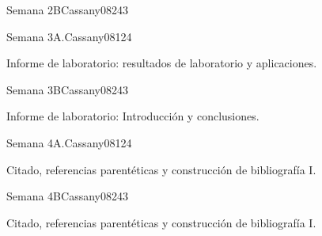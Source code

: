\begin{syllabus}
\begin{unit}{Semana 2B}{Cassany08}{24}{3}
   \begin{learningoutcomes}
      \item 
      \item
      \item 
      \end{learningoutcomes}
\end{unit}

\begin{unit}{Semana 3A.}{Cassany08}{12}{4}
   \begin{topics}
      \item Informe de laboratorio: resultados de laboratorio y aplicaciones. 
   \end{topics}
   \begin{learningoutcomes}
      \item 
   \end{learningoutcomes}
\end{unit}

\begin{unit}{Semana 3B}{Cassany08}{24}{3}
   \begin{topics}
      \item Informe de laboratorio: Introducción y conclusiones. 
   \end{topics}

   \begin{learningoutcomes}
      \item 
      \item
      \item 
      \end{learningoutcomes}
\end{unit}

\begin{unit}{Semana 4A.}{Cassany08}{12}{4}
   \begin{topics}
      \item Citado, referencias parentéticas y construcción de bibliografía I. 
   \end{topics}
   \begin{learningoutcomes}
      \item 
   \end{learningoutcomes}
\end{unit}

\begin{unit}{Semana 4B}{Cassany08}{24}{3}
   \begin{topics}
      \item Citado, referencias parentéticas y construcción de bibliografía I.
   \end{topics}


\end{unit}
\end{syllabus}
